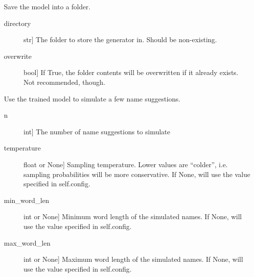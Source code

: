 \documentclass[letterpaper,10pt,english]{sphinxmanual}
\begin{document}
\begin{fulllineitems}
\begin{fulllineitems}
\begin{description}
\end{description}

\end{fulllineitems}


\begin{fulllineitems}
\label{\detokenize{modules:sng.Generator.Generator.save}}
Save the model into a folder.
\begin{description}
\item[{directory}] \leavevmode{[}str{]}
The folder to store the generator in. Should be non-existing.

\item[{overwrite}] \leavevmode{[}bool{]}
If True, the folder contents will be overwritten if it already
exists. Not recommended, though.

\end{description}

\end{fulllineitems}


\begin{fulllineitems}
\label{\detokenize{modules:sng.Generator.Generator.simulate}}
Use the trained model to simulate a few name suggestions.
\begin{description}
\item[{n}] \leavevmode{[}int{]}
The number of name suggestions to simulate

\item[{temperature}] \leavevmode{[}float or None{]}
Sampling temperature. Lower values are “colder”, i.e.
sampling probabilities will be more conservative.
If None, will use the value specified in self.config.

\item[{min\_word\_len}] \leavevmode{[}int or None{]}
Minimum word length of the simulated names.
If None, will use the value specified in self.config.

\item[{max\_word\_len}] \leavevmode{[}int or None{]}
Maximum word length of the simulated names.
If None, will use the value specified in self.config.

\end{description}

\end{fulllineitems}


\end{fulllineitems}
\end{document}
